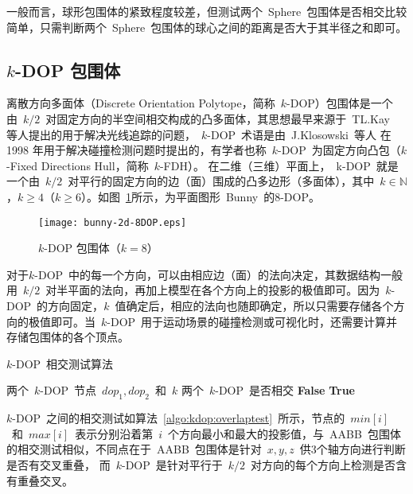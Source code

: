一般而言，球形包围体的紧致程度较差，但测试两个~Sphere~包围体是否相交比较简单，只需判断两个~Sphere~包围体的球心之间的距离是否大于其半径之和即可。

\subsection{$k$-DOP 包围体}

离散方向多面体（Discrete Orientation Polytope，简称~$k$-DOP）包围体是一个由~$k/2$~对固定方向的半空间相交构成的凸多面体，其思想最早来源于~TL.Kay~\cite{Kay1986Ray}
等人提出的用于解决光线追踪的问题，~$k$-DOP~术语是由~J.Klosowski~等人\cite{klosowski1998efficient}
在1998 年用于解决碰撞检测问题时提出的，有学者也称~$k$-DOP~为固定方向凸包（$k$-Fixed
Directions Hull，简称~$k$-FDH）\cite{weiyingmei2001}。
在二维（三维）平面上，~k-DOP~就是一个由~$k/2$~对平行的固定方向的边（面）围成的凸多边形（多面体），其中~$k\in\mathbb{N}$，$k\geq4$（$k\geq6$）。如图~\ref{fig:8dop-bunny}所示，为平面图形~Bunny~的$8$-DOP。
\begin{figure}[htbp] %
  \centering
  \texttt{[image: bunny-2d-8DOP.eps]}
  \caption{$k$-DOP 包围体（$k=8$）}
  \label{fig:8dop-bunny}
\end{figure}

对于$k$-DOP~中的每一个方向，可以由相应边（面）的法向决定，其数据结构一般用~$k/2$~对半平面的法向，再加上模型在各个方向上的投影的极值即可。因为~$k$-DOP~的方向固定，$k$~值确定后，相应的法向也随即确定，所以只需要存储各个方向的极值即可。当~$k$-DOP~用于运动场景的碰撞检测或可视化时，还需要计算并存储包围体的各个顶点。

\begin{algorithm}
\caption{$k$-DOP~相交测试算法}
\small
\label{algo:kdop:overlaptest}
\begin{algorithmic}[1]
\Require
两个~$k$-DOP~节点~$dop_1, dop_2$~和~$k$ 
\Ensure
两个~$k$-DOP~是否相交
          \State \Return \textbf{False} 
      \EndIf
  \EndFor
  \State \Return \textbf{True} 
\EndFunction
\end{algorithmic}
\end{algorithm}

$k$-DOP~之间的相交测试如算法~\ref{algo:kdop:overlaptest}~所示\cite{ericson2005real}，节点的~$min[i]$~和~$max[i]$~表示分别沿着第~$i$~个方向最小和最大的投影值，与~AABB~包围体的相交测试相似，不同点在于~AABB~包围体是针对~$x,y,z$~供3个轴方向进行判断是否有交叉重叠，
而~$k$-DOP~是针对平行于~$k/2$~对方向的每个方向上检测是否含有重叠交叉。

